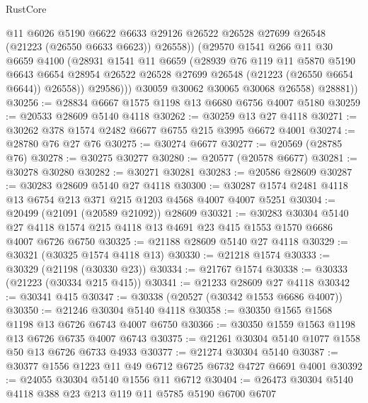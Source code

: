 \begin{lexlean}{RustCore}
\begin{coremodule}
                  @11
                  @6026
                  @5190
                  @6622
                  @6633
                  @29126
                  @26522
                  @26528
                  @27699
                  @26548
                  (@21223 (@26550 @6633 @6623))
                  @26558))
              (@29570
                @1541
                @266
                @11
                @30
                @6659
                @4100
                (@28931
                  @1541
                  @11
                  @6659
                  (@28939
                    @76
                    @119
                    @11
                    @5870
                    @5190
                    @6643
                    @6654
                    @28954
                    @26522
                    @26528
                    @27699
                    @26548
                    (@21223 (@26550 @6654 @6644))
                    @26558))
                @29586)))
          @30059
          @30062
          @30065
          @30068
          @26558)
        @28881))
@30256 := @28834 @6667 @1575 @1198 @13 @6680 @6756 @4007 @5180
@30259 := @20533 @28609 @5140 @4118
@30262 := @30259 @13 @27 @4118
@30271 := @30262 @378 @1574 @2482 @6677 @6755 @215 @3995 @6672 @4001
@30274 := @28780 @76 @27 @76
@30275 := @30274 @6677
@30277 := @20569 (@28785 @76)
@30278 := @30275 @30277
@30280 := @20577 (@20578 @6677)
@30281 := @30278 @30280
@30282 := @30271 @30281
@30283 := @20586 @28609
@30287 := @30283 @28609 @5140 @27 @4118
@30300 := @30287 @1574 @2481 @4118 @13 @6754 @213 @371 @215 @1203 @4568 @4007 @4007 @5251
@30304 := @20499 (@21091 (@20589 @21092)) @28609
@30321 := @30283
    @30304
    @5140
    @27
    @4118
    @1574
    @215
    @4118
    @13
    @4691
    @23
    @415
    @1553
    @1570
    @6686
    @4007
    @6726
    @6750
@30325 := @21188 @28609 @5140 @27 @4118
@30329 := @30321 (@30325 @1574 @4118 @13)
@30330 := @21218 @1574
@30333 := @30329 (@21198 (@30330 @23))
@30334 := @21767 @1574
@30338 := @30333 (@21223 (@30334 @215 @415))
@30341 := @21233 @28609 @27 @4118
@30342 := @30341 @415
@30347 := @30338 (@20527 (@30342 @1553 @6686 @4007))
@30350 := @21246 @30304 @5140 @4118
@30358 := @30350 @1565 @1568 @1198 @13 @6726 @6743 @4007 @6750
@30366 := @30350 @1559 @1563 @1198 @13 @6726 @6735 @4007 @6743
@30375 := @21261 @30304 @5140 @1077 @1558 @50 @13 @6726 @6733 @4933
@30377 := @21274 @30304 @5140
@30387 := @30377 @1556 @1223 @11 @49 @6712 @6725 @6732 @4727 @6691 @4001
@30392 := @24055 @30304 @5140 @1556 @11 @6712
@30404 := @26473 @30304 @5140 @4118 @388 @23 @213 @119 @11 @5785 @5190 @6700 @6707

\end{coremodule}
\end{lexlean}
